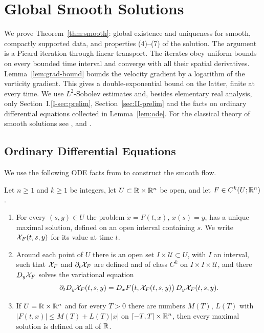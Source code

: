 \section{Global Smooth Solutions}
\label{app:smooth}

We prove Theorem~\ref{thm:smooth}: global existence and uniqueness for smooth,
compactly supported data, and properties (4)--(7) of the solution. The argument
is a Picard iteration through linear transport. The iterates obey uniform
bounds on every bounded time interval and converge with all their spatial
derivatives. Lemma~\ref{lem:grad-bound} bounds the velocity gradient by a
logarithm of the vorticity gradient. This gives a double-exponential bound on
the latter, finite at every time. We use $L^2$-Sobolev estimates and, besides
elementary real analysis, only
Section~I.\ref{I-sec:prelim}, Section~\ref{sec:II-prelim} and the facts on ordinary differential equations
collected in Lemma~\ref{lem:ode}. For
the classical theory of smooth solutions see \cite{Wolibner}, \cite{Holder} and
\cite{Kato1967}.

\subsection{Ordinary Differential Equations}

We use the following ODE facts from \cite{Teschl} to construct the smooth flow.

\begin{lemma}
\label{lem:ode}
Let $n\ge1$ and $k\ge1$ be integers, let $U\subset\mathbb{R}\times\mathbb{R}^n$ be open, and let
$F\in C^k(U;\mathbb{R}^n)$.
\begin{enumerate}[label=\textup{(\roman*)}]
\item For every $(s,y)\in U$ the problem $\dot x=F(t,x)$, $x(s)=y$, has a unique
  maximal solution, defined on an open interval containing $s$. We write
  $\mathcal{X}_F(t,s,y)$ for its value at time $t$.
\item Around each point of $U$ there is an open set $I\times\mathcal U\subset U$,
  with $I$ an interval, such that $\mathcal{X}_F$ and $\partial_t\mathcal{X}_F$ are defined
  and of class $C^k$ on $I\times I\times\mathcal U$, and there $D_y\mathcal{X}_F$
  solves the variational equation
  \[
  \partial_tD_y\mathcal{X}_F(t,s,y)=D_xF\big(t,\mathcal{X}_F(t,s,y)\big)\,D_y\mathcal{X}_F(t,s,y).
  \]
\item If $U=\mathbb{R}\times\mathbb{R}^n$ and for every $T>0$ there are numbers $M(T)$, $L(T)$
  with $|F(t,x)|\le M(T)+L(T)|x|$ on $[-T,T]\times\mathbb{R}^n$, then every maximal
  solution is defined on all of $\mathbb{R}$.
\end{enumerate}
\end{lemma}

